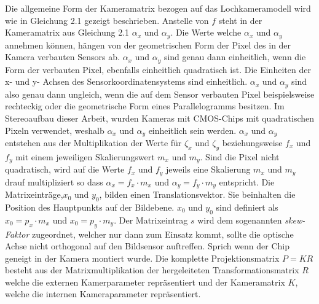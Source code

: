 Die allgemeine Form der Kameramatrix bezogen auf das Lochkameramodell wird wie in Gleichung 2.1 gezeigt beschrieben. Anstelle von $f$ steht in der Kameramatrix aus Gleichung 2.1 $\alpha_x$ und $\alpha_y$. Die Werte welche $\alpha_x$ und $\alpha_y$ annehmen können, hängen von der geometrischen Form der Pixel des in der Kamera verbauten Sensors ab\cite{HZ,Photonik}.  $\alpha_x$ und $\alpha_y$ sind genau dann einheitlich, wenn die Form der verbauten Pixel, ebenfalls einheitlich quadratisch ist. Die Einheiten der x- und y- Achsen des Sensorkoordinatensystems sind einheitlich. $\alpha_x$ und $\alpha_y$ sind also genau dann ungleich, wenn die auf dem Sensor verbauten Pixel beispielsweise rechteckig oder die geometrische Form eines Parallelogramms besitzen\cite{HZ}. Im Stereoaufbau dieser Arbeit, wurden Kameras mit CMOS-Chips mit quadratischen Pixeln verwendet, weshalb $\alpha_x$ und $\alpha_y$ einheitlich sein werden. $\alpha_x$ und $\alpha_y$ entstehen aus der Multiplikation der Werte für $\zeta_x$ und $\zeta_y$ beziehungsweise  $f_x$ und $f_y$ mit einem jeweiligen Skalierungswert $m_x$ und $m_y$. Sind die Pixel nicht quadratisch, wird auf die Werte $f_x$ und $f_y$ jeweils eine Skalierung $m_x$ und $m_y$ drauf multipliziert so dass  $\alpha_x = f_x \cdot m_x$ und $\alpha_y = f_y \cdot m_y$ entspricht\cite{HZ}. Die Matrixeinträge,$x_{0}$ und $y_{0}$, bilden einen Translationsvektor. Sie beinhalten die Position des Hauptpunkts auf der Bildebene. $x_{0}$ und $y_{0}$ sind definiert als $x_{0} = p_x \cdot m_x$ und $x_{0} = p_y \cdot m_y$. Der Matrixeintrag $s$ wird dem sogenannten \textit{skew-Faktor} zugeordnet, welcher nur dann zum Einsatz kommt, sollte die optische Achse nicht orthogonal auf den Bildsensor auftreffen. Sprich wenn der Chip geneigt in der Kamera montiert wurde\cite{HZ}. Die komplette Projektionsmatrix $P=KR$\cite{HZ} besteht aus der Matrixmultiplikation der hergeleiteten Transformationsmatrix $R$ welche die externen Kamerparameter repräsentiert und der Kameramatrix $K$, welche die internen Kameraparameter repräsentiert\cite{HZ,ZZGXr}.


